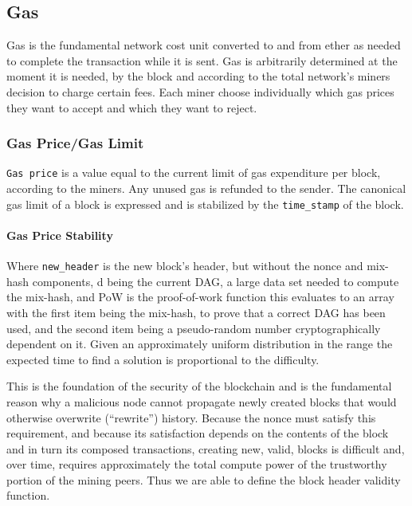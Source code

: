 \documentclass[10pt,letterpaper,leqno,bibliography=totoc]{scrartcl}
\newenvironment{alphafootnotes}
{\par\edef\savedfootnotenumber{\number\value{footnote}}
\renewcommand{\thefootnote}{\alph{footnote}}
\setcounter{footnote}{0}}
{\par\setcounter{footnote}{\savedfootnotenumber}}
\begin{document}
\begin{alphafootnotes}
\begin{multicols*}{2}
				\subsection{Gas}
				Gas is the fundamental network cost unit converted to and from ether as needed to complete the transaction while it is sent. Gas is arbitrarily determined at the moment it is needed, by the block and according to the total network's miners decision to charge certain fees. Each miner choose individually which gas prices they want to accept and which they want to reject.
	
				\subsubsection{Gas Price/Gas Limit}
					\texttt{Gas price} is a value equal to the current limit of gas expenditure per block, according to the miners. Any unused gas is refunded to the sender. The canonical gas limit of a block is expressed  and is stabilized by the \texttt{time\_stamp} of the block.

				\paragraph{Gas Price Stability}
					Where \texttt{new\_header} is the new block’s header, but without the nonce and mix-hash components, d being the current DAG, a large data set needed to compute the mix-hash, and PoW is the proof-of-work function this evaluates to an array with the first item being the mix-hash, to prove that a correct DAG has been used, and the second item being a pseudo-random number cryptographically dependent on it. Given an approximately uniform distribution in the range the expected time to find a solution is proportional to the difficulty.\supercite{Wood2017} 
					
					
					This is the foundation of the security of the blockchain and is the fundamental reason why a malicious node cannot propagate newly created blocks that would otherwise overwrite (“rewrite”) history. Because the nonce must satisfy this requirement, and because its satisfaction depends on the contents of the block and in turn its composed transactions, creating new, valid, blocks is difficult and, over time, requires approximately the total compute power of the trustworthy portion of the mining peers. Thus we are able to define the block header validity function.
				

\end{multicols*}
\end{alphafootnotes}
\end{document}
